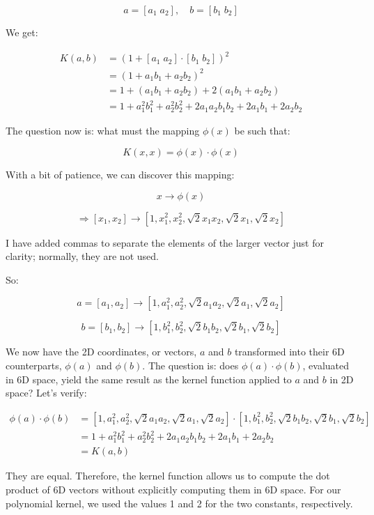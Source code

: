 \documentclass[11pt]{article}
\begin{document}
$$
a = [a_1 \; a_2], \quad b = [b_1 \; b_2]
$$

We get:

\begin{align*}
K(a, b) &= (1 + [a_1 \; a_2] \cdot [b_1 \; b_2])^2 \\
&= (1 + a_1b_1 + a_2b_2)^2 \\
&= 1 + (a_1b_1 + a_2b_2) + 2(a_1b_1 + a_2b_2) \\
&= 1 + a_1^2b_1^2 + a_2^2b_2^2 + 2a_1a_2b_1b_2 + 2a_1b_1 + 2a_2b_2
\end{align*}

The question now is: what must the mapping $\phi(x)$ be such that:

$$
K(x, x) = \phi(x) \cdot \phi(x)
$$

With a bit of patience, we can discover this mapping:

$$
x \to \phi(x)
$$

$$
\Rightarrow [x_1, x_2] \to [1, x_1^2, x_2^2, \sqrt{2}x_1x_2, \sqrt{2}x_1, \sqrt{2}x_2]
$$

I have added commas to separate the elements of the larger vector just
for clarity; normally, they are not used.

So:

$$
a = [a_1, a_2] \to [1, a_1^2, a_2^2, \sqrt{2}a_1a_2, \sqrt{2}a_1, \sqrt{2}a_2]
$$

$$
b = [b_1, b_2] \to [1, b_1^2, b_2^2, \sqrt{2}b_1b_2, \sqrt{2}b_1, \sqrt{2}b_2]
$$

We now have the 2D coordinates, or vectors, $a$ and $b$ transformed
into their 6D counterparts, $\phi(a)$ and $\phi(b)$. The question
is: does $\phi(a) \cdot \phi(b)$, evaluated in 6D space, yield the
same result as the kernel function applied to $a$ and $b$ in 2D
space? Let's verify:

\begin{align*}
\phi(a) \cdot \phi(b) & = [1, a_1^2, a_2^2, \sqrt{2}a_1a_2, \sqrt{2}a_1, \sqrt{2}a_2] \cdot [1, b_1^2, b_2^2, \sqrt{2}b_1b_2, \sqrt{2}b_1, \sqrt{2}b_2] \\
& = 1 + a_1^2b_1^2 + a_2^2b_2^2 + 2a_1a_2b_1b_2 + 2a_1b_1 + 2a_2b_2 \\
& = K(a, b)
\end{align*}

They are equal. Therefore, the kernel function allows us to compute the
dot product of 6D vectors without explicitly computing them in 6D space.
For our polynomial kernel, we used the values 1 and 2 for the two
constants, respectively.
\end{document}
